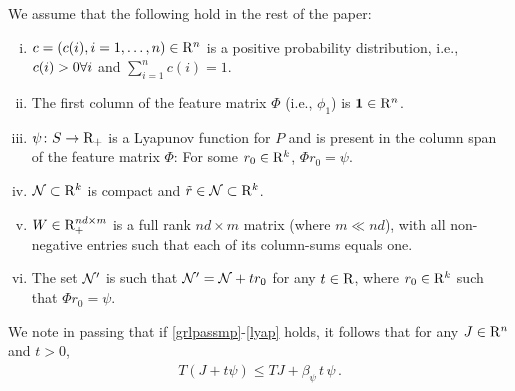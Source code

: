 We assume that the following hold in the rest of the paper:
\begin{assumption}\label{grlpassmp}
\begin{enumerate}[(i)]
\item \label{probdist} $c=(c(i),i=1,\ldots,n)\in \mathrm{R}^n$ is a positive probability distribution, i.e., $c(i)>0 \relax{ } \forall i$ and $\sum_{i=1}^n c(i)=1$.
\item  \label{one} The first column of the feature matrix $\Phi$ (i.e., $\phi_1$) is $\mathbf{1} \in \mathrm{R}^n$. 
\item \label{lyap} $\psi\colon S \rightarrow \mathrm{R}_+$ is a Lyapunov function for $P$
and is present in the column span of the feature matrix $\Phi$: For some $r_0\in \mathrm{R}^k$, $\Phi r_0 = \psi$. 
\item \label{nassmp} $\mathcal{N}\subset \mathrm{R}^k$ is compact and $\tilde{r} \in \mathcal{N}\subset\mathrm{R}^k$.
\item \label{wassump} $W \in \mathrm{R}^{nd\times m}_+$ is a full rank $nd\times m$ matrix (where $m\ll nd$), with all non-negative entries such that each of its column-sums equals one.
\item \label{ass:n4} The set $\mathcal{N}'$ is such that $\mathcal{N}' = \mathcal{N} + t r_0$ for any $t\in \mathrm{R}$, where $r_0\in \mathrm{R}^k$ such that $\Phi r_0 = \psi$.
\end{enumerate}
\end{assumption}
We note in passing that if \cref{grlpassmp}-\eqref{lyap} holds, it follows that for any $J\in \mathrm{R}^n$ and $t>0$,
\begin{align}
\label{eq:psilin}
T(J+ t \psi ) \le TJ + \beta_{\psi}\,t\,  \psi\,. %
\end{align}


